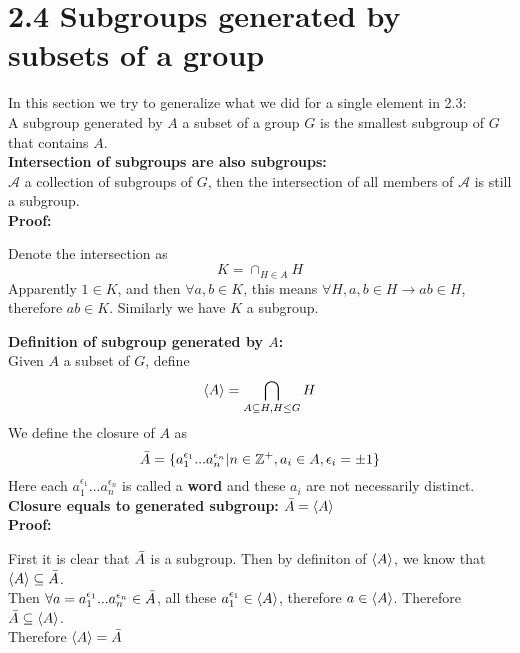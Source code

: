 \documentclass{article}
\begin{document}
\section{2.4 Subgroups generated by subsets of a group}
In this section we try to generalize what we did for a single element in 2.3:\\
A subgroup generated by $A$ a subset of a group $G$ is the smallest subgroup of $G$ that contains $A$.\\
\textbf{Intersection of subgroups are also subgroups:}\\
$\mathcal{A}$ a collection of subgroups of $G$, then the intersection of all members of $\mathcal{A}$ is still a subgroup.\\
\textbf{Proof:}
\begin{addmargin}[1em]{0em}
Denote the intersection as
\begin{equation*}
    K = \cap_{H \in A} H
\end{equation*}
Apparently $1 \in K$, and then $\forall a, b \in K$, this means $\forall H, a, b \in H \rightarrow ab \in H$, therefore $ab \in K$. Similarly we have $K$ a subgroup.
\end{addmargin}
\textbf{Definition of subgroup generated by $A$:}\\
Given $A$ a subset of $G$, define
\begin{equation*}
    \braket{A} = \bigcap_{A \subseteq H, H \leq G} H
\end{equation*}
We define the closure of $A$ as
\begin{equation*}
    \Bar{A} = \{a_1^{\epsilon_1} ... a_n^{\epsilon_n}|n \in \mathbb{Z}^+, a_i \in A, \epsilon_i=\pm 1\}
\end{equation*}
Here each $a_1^{\epsilon_1}...a_n^{\epsilon_n}$ is called a \textbf{word} and these $a_i$ are not necessarily distinct.\\
\textbf{Closure equals to generated subgroup:} $\Bar{A} = \braket{A}$\\
\textbf{Proof:}
\begin{addmargin}[1em]{0em}
First it is clear that $\Bar{A}$ is a subgroup. Then by definiton of $\braket{A}$, we know that $\braket{A} \subseteq \Bar{A}$.\\
Then $\forall a = a_1^{\epsilon_1} ... a_n^{\epsilon_n} \in \Bar{A}$, all these $a_1^{\epsilon_1} \in \braket{A}$, therefore $a \in \braket{A}$. Therefore $\Bar{A} \subseteq \braket{A}$.\\
Therefore $\braket{A} = \Bar{A}$
\end{addmargin}
\end{document}
